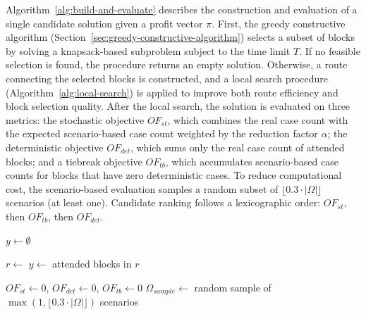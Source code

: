 Algorithm~\ref{alg:build-and-evaluate} describes the construction and evaluation of a
single candidate solution given a profit vector $\pi$. First, the greedy constructive
algorithm (Section~\ref{sec:greedy-constructive-algorithm}) selects a subset of blocks by
solving a knapsack-based subproblem subject to the time limit $T$. If no feasible selection
is found, the procedure returns an empty solution. Otherwise, a route connecting the
selected blocks is constructed, and a local search procedure
(Algorithm~\ref{alg:local-search}) is applied to improve both route efficiency and block
selection quality. After the local search, the solution is evaluated on three metrics: the
stochastic objective $OF_{st}$, which combines the real case count with the expected
scenario-based case count weighted by the reduction factor $\alpha$; the deterministic
objective $OF_{det}$, which sums only the real case count of attended blocks; and a tiebreak
objective $OF_{tb}$, which accumulates scenario-based case counts for blocks that have zero
deterministic cases. To reduce computational cost, the scenario-based evaluation samples a
random subset of $\lfloor 0.3 \cdot |\Omega| \rfloor$ scenarios (at least one). Candidate
ranking follows a lexicographic order: $OF_{st}$, then $OF_{tb}$, then $OF_{det}$.

\begin{algorithm}[h!]
	\caption{Build and Evaluate Candidate Solution} \label{alg:build-and-evaluate}
	\SetAlgoLined

	$y \leftarrow \emptyset$\;

	\;


	$r \leftarrow$ \;
	\;
	$y \leftarrow$ attended blocks in $r$\;

	$OF_{st} \leftarrow 0$, $OF_{det} \leftarrow 0$, $OF_{tb} \leftarrow 0$\;
	$\Omega_{sample} \leftarrow$ random sample of $\max(1, \lfloor 0.3 \cdot |\Omega| \rfloor)$ scenarios\;


	\;
\end{algorithm}

